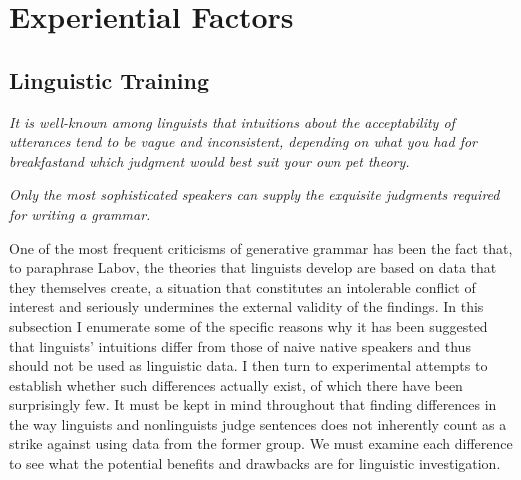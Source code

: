 \section{Experiential Factors}\label{sec:4.4}

\subsection{ Linguistic Training} \label{sec:4.4.1}

\epigraph{\textit{It is well-known among linguists that intuitions about the acceptability of utterances tend to be vague and inconsistent, depending on what you had for breakfast}\footnotemark\textit{and which judgment  would best suit your own pet theory.\\[-2\baselineskip]}\footnotemark}{\citep{Dahl1979}}


\epigraph{\textit{Only the most sophisticated  speakers can supply the exquisite judgments  required for  writing a grammar.}\\[-2\baselineskip]}{\citep{GleitmanEtAl1970}}



\noindent One of the most frequent criticisms of generative grammar has been the fact that, to paraphrase Labov, the theories that linguists develop are based on data that they themselves create, a situation that constitutes an intolerable conflict of interest and seriously undermines the external validity of the findings. In this subsection I enumerate some of the specific reasons why it has been suggested that linguists' intuitions differ from those of naive native  speakers and thus should not be used as linguistic data. I then turn to experimental attempts to establish whether such differences actually exist, of which there have been surprisingly few. It must be kept in mind throughout that finding differences in the way linguists
and nonlinguists judge sentences does not inherently count as a strike against using data from the former group. We must examine each difference to see what the potential benefits and drawbacks are for linguistic investigation.

